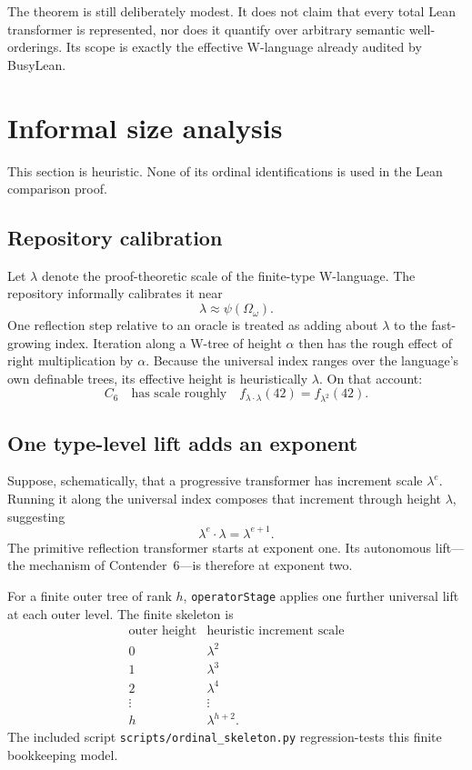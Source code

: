 \documentclass[11pt]{article}
\theoremstyle{definition}
\theoremstyle{remark}
\newcommand{\lean}[1]{\texttt{#1}}
\newcommand{\codepath}[1]{\texttt{#1}}
\begin{document}
The theorem is still deliberately modest.  It does not claim that every total
Lean transformer is represented, nor does it quantify over arbitrary semantic
well-orderings.  Its scope is exactly the effective W-language already audited
by BusyLean.

\section{Informal size analysis}
\label{sec:size}

This section is heuristic.  None of its ordinal identifications is used in the
Lean comparison proof.

\subsection{Repository calibration}

Let \(\lambda\) denote the proof-theoretic scale of the finite-type W-language.
The repository informally calibrates it near
\[
  \lambda\approx\psi(\Omega_\omega).
\]
One reflection step relative to an oracle is treated as adding about
\(\lambda\) to the fast-growing index.  Iteration along a W-tree of height
\(\alpha\) then has the rough effect of right multiplication by \(\alpha\).
Because the universal index ranges over the language's own definable trees,
its effective height is heuristically \(\lambda\).  On that account:
\[
  C_6\quad\text{has scale roughly}\quad f_{\lambda\cdot\lambda}(42)
  =f_{\lambda^2}(42).
\]

\subsection{One type-level lift adds an exponent}

Suppose, schematically, that a progressive transformer has increment scale
\(\lambda^e\).  Running it along the universal index composes that increment
through height \(\lambda\), suggesting
\[
  \lambda^e\cdot\lambda=\lambda^{e+1}.
\]
The primitive reflection transformer starts at exponent one.  Its autonomous
lift---the mechanism of Contender~6---is therefore at exponent two.

For a finite outer tree of rank \(h\), \lean{operatorStage} applies one further
universal lift at each outer level.  The finite skeleton is
\[
\begin{array}{c|c}
\text{outer height} & \text{heuristic increment scale}\\
\hline
0 & \lambda^2\\
1 & \lambda^3\\
2 & \lambda^4\\
\vdots & \vdots\\
h & \lambda^{h+2}.
\end{array}
\]
The included script \codepath{scripts/ordinal\_skeleton.py} regression-tests
this finite bookkeeping model.
\end{document}
